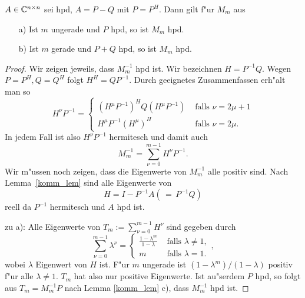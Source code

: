 \begin{lem} \label{hpd_lem} $A \in \mathbb{C}^{n \times n}$ sei hpd, $A = P-Q$ mit $P = P^H$.
Dann gilt f"ur $M_m$ aus \label{S467}
\begin{itemize}
\item[a)] Ist $m$ ungerade und $P$ hpd, so ist $M_m$ hpd.
\item[b)] Ist $m$ gerade und $P+Q$ hpd, so ist $M_m$ hpd.
\end{itemize}
\end{lem}
\begin{proof}
Wir zeigen jeweils, dass $M_m^{-1}$ hpd ist. Wir bezeichnen $H = P^{-1}Q$.
Wegen $P=P^H, Q=Q^H$ folgt $H^H = QP^{-1}$. Durch geeignetes Zusammenfassen
erh"alt man so
\[
H^\nu P^{-1} = \left\{ \begin{array}{ll}
   (H^\mu P^{-1})^HQ(H^\mu P^{-1})  & \mbox{ falls } \nu = 2\mu+1 \\
  H^\mu P^{-1} (H^\mu)^H    & \mbox{ falls } \nu = 2\mu.
    \end{array}
\right.
\]
In jedem Fall ist also $H^\nu P^{-1}$ hermitesch und damit auch
\[
M_m^{-1} = \sum_{\nu=0}^{m-1} H^\nu P^{-1}.
\]
Wir m"ussen noch zeigen, dass die Eigenwerte von $M_m^{-1}$ alle positiv sind.
Nach Lemma~\ref{komm_lem} sind alle Eigenwerte von
\[H = I - P^{-1}A  (\, =\, P^{-1}Q) \]
reell da $P^{-1}$ hermitesch und $A$ hpd ist.

\medskip

\noindent zu a): Alle Eigenwerte von $T_m := \sum_{\nu=0}^{m-1}H^\nu$ sind gegeben durch
\begin{equation} \label{TmEwe_eq}
\sum_{\nu=0}^{m-1} \lambda^\nu =
\left\{ \begin{array}{ll}
   \frac{1-\lambda^m}{1-\lambda}  & \mbox{ falls } \lambda \not = 1, \\
   m    & \mbox{ falls } \lambda = 1.
    \end{array}
\right. ,
\end{equation}
wobei $\lambda$ Eigenwert von $H$ ist. F"ur $m$ ungerade ist $(1-\lambda^m)/(1-\lambda) $ positiv f"ur alle $\lambda \not = 1$.
$T_m$ hat also nur positive Eigenwerte. Ist au"serdem $P$ hpd, so folgt aus
$T_m = M_m^{-1}P$ nach Lemma \ref{komm_lem} c), dass $M_m^{-1}$ hpd ist.

\medskip


\end{proof}
